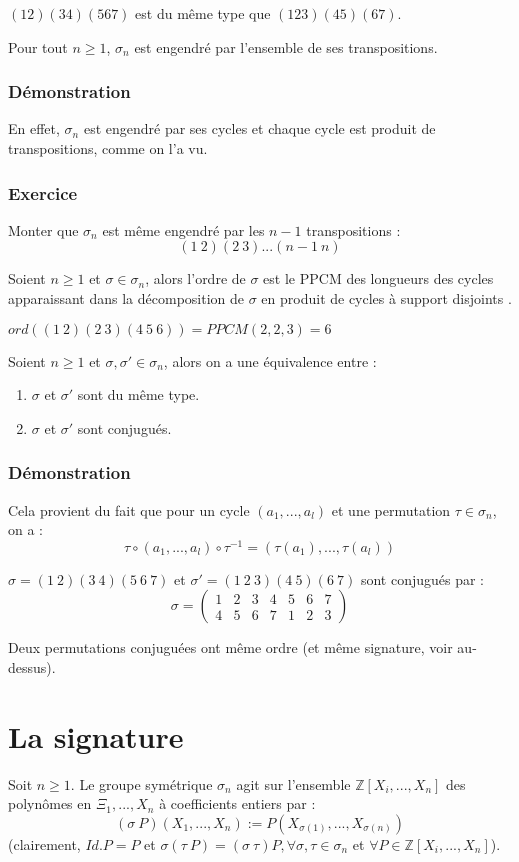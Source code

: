 \documentclass[a4paper, oneside]{report}
\theoremstyle{break}
\newcommand{\Z}{\mathbb{Z}}
\newcommand{\pcsd}{produit de cycles à support disjoints }
\newcommand{\dem}{\subsubsection{Démonstration}}
\begin{document}
\exem
$(12)(34)(567)$ est du même type que $(123)(45)(67)$.

\cor
Pour tout $n\geq 1$, $\sigma_n$ est engendré par l'ensemble de ses transpositions.

\dem
En effet, $\sigma_n$ est engendré par ses cycles et chaque cycle est produit de transpositions, comme on l'a vu.

\subsubsection{Exercice}
Monter que $\sigma_n$ est même engendré par les $n-1$ transpositions :
$$(1~2)(2~3)...(n-1~n)$$

\cor
Soient $n\geq 1$ et $\sigma\in \sigma_n$, alors l'ordre de $\sigma$ est le PPCM des longueurs des cycles apparaissant dans la décomposition de $\sigma$ en \pcsd.

\exem
$ord((1~2)(2~3)(4~5~6)) = PPCM(2,2,3)=6$

\cor
Soient $n\geq 1$ et $\sigma, \sigma ' \in \sigma_n$, alors on a une équivalence entre :
\begin{enumerate}
\item $\sigma$ et $\sigma '$ sont du même type.
\item $\sigma$ et $\sigma '$ sont conjugués.
\end{enumerate}

\dem
Cela provient du fait que pour un cycle $(a_1,...,a_l)$ et une permutation $\tau\in \sigma_n$, on a :
$$\tau \circ (a_1,...,a_l) \circ \tau^{-1}=(\tau(a_1),...,\tau(a_l))$$

\exem
$\sigma = (1~2)(3~4)(5~6~7)$ et $\sigma '=(1~2~3)(4~5)(6~7)$ sont conjugués par :
$$\sigma = \left(\begin{array}{lllllll}
1&2&3&4&5&6&7\\
4&5&6&7&1&2&3
\end{array}\right)$$

\remar
Deux permutations conjuguées ont même ordre (et même signature, voir au-dessus).

\section{La signature}
Soit $n\geq 1$. Le groupe symétrique $\sigma_n$ agit sur l'ensemble $\Z[X_i,...,X_n]$ des polynômes en $\Xi_1,...,X_n$ à coefficients entiers par :
$$(\sigma~P)(X_1,...,X_n):= P(X_{\sigma(1)},...,X_{\sigma(n)})$$
(clairement, $Id.P=P$ et $\sigma(\tau~P)=(\sigma~\tau)P, \forall \sigma,\tau \in \sigma_n$ et $\forall P\in \Z[X_i,...,X_n]$).\\
\end{document}
